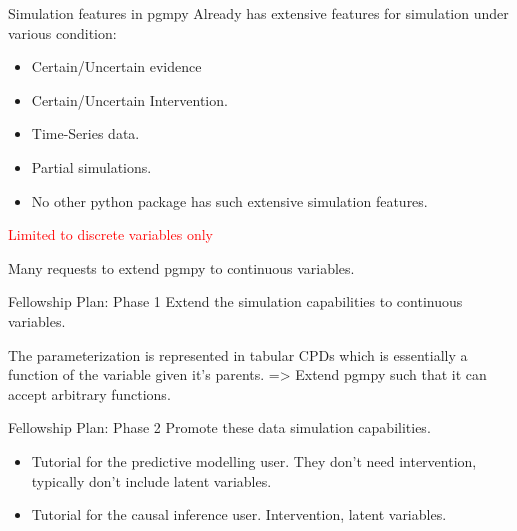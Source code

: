 \documentclass{beamer}
\begin{document}
\begin{frame}{Simulation features in pgmpy}
	Already has extensive features for simulation under various condition:
	\begin{itemize}
		\item Certain/Uncertain evidence
		\item Certain/Uncertain Intervention.
		\item Time-Series data.
		\item Partial simulations.
	\end{itemize}

	\vspace{1em}
	\begin{itemize}
		\item No other python package has such extensive simulation features.
	\end{itemize}

	\vspace{3em}
	\centerline{\textcolor{red}{Limited to discrete variables only}}
	\centerline{Many requests to extend pgmpy to continuous variables.}



\end{frame}

\begin{frame}{Fellowship Plan: Phase 1}
	Extend the simulation capabilities to continuous variables.


	The parameterization is represented in tabular CPDs which is essentially a function of the variable given it's parents. => Extend pgmpy such that it can accept arbitrary functions.
\end{frame}

\begin{frame}{Fellowship Plan: Phase 2}
	Promote these data simulation capabilities.

	\begin{itemize}
		\item Tutorial for the predictive modelling user. They don't need intervention, typically don't include latent variables.
		\item Tutorial for the causal inference user. Intervention, latent variables.
	\end{itemize}
\end{frame}
\end{document}
